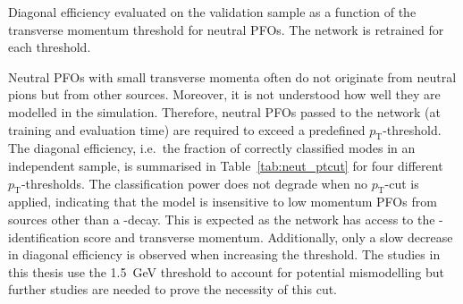 \begin{table}[htb]
  \centering
  {\small}
  \caption{Diagonal efficiency evaluated on the validation sample as a function
    of the transverse momentum threshold for neutral PFOs. The network is
    retrained for each threshold.}
  \label{tab:neut_ptcut}
\end{table}

Neutral PFOs with small transverse momenta often do not originate from neutral
pions but from other sources. Moreover, it is not understood how well they are
modelled in the simulation. Therefore, neutral PFOs passed to the network (at
training and evaluation time) are required to exceed a predefined
$p_\text{T}$-threshold. The diagonal efficiency, i.e.\ the fraction of correctly
classified modes in an independent sample, is summarised in
Table~\ref{tab:neut_ptcut} for four different $p_\text{T}$-thresholds. The
classification power does not degrade when no $p_\text{T}$-cut is applied,
indicating that the model is insensitive to low momentum PFOs from sources other
than a -decay. This is expected as the network has access to the
-identification score and transverse momentum. Additionally, only
a slow decrease in diagonal efficiency is observed when increasing the
threshold. The studies in this thesis use the \SI{1.5}{\giga\electronvolt}
threshold to account for potential mismodelling but further studies are needed
to prove the necessity of this cut.


